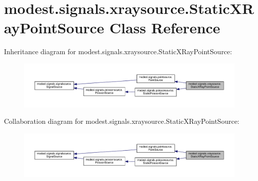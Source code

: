 \hypertarget{classmodest_1_1signals_1_1xraysource_1_1StaticXRayPointSource}{}\section{modest.\+signals.\+xraysource.\+Static\+X\+Ray\+Point\+Source Class Reference}
\label{classmodest_1_1signals_1_1xraysource_1_1StaticXRayPointSource}


Inheritance diagram for modest.\+signals.\+xraysource.\+Static\+X\+Ray\+Point\+Source\+:\nopagebreak
\begin{figure}[H]
\begin{center}
\leavevmode
\includegraphics[width=350pt]{classmodest_1_1signals_1_1xraysource_1_1StaticXRayPointSource__inherit__graph}
\end{center}
\end{figure}


Collaboration diagram for modest.\+signals.\+xraysource.\+Static\+X\+Ray\+Point\+Source\+:\nopagebreak
\begin{figure}[H]
\begin{center}
\leavevmode
\includegraphics[width=350pt]{classmodest_1_1signals_1_1xraysource_1_1StaticXRayPointSource__coll__graph}
\end{center}
\end{figure}
